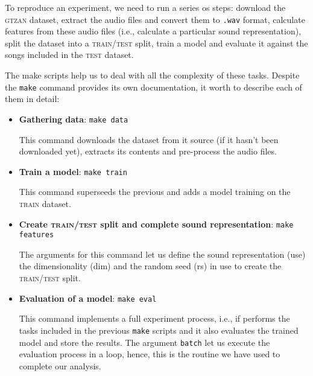 To reproduce an experiment, we need to run a series os steps: download the \textsc{gtzan} dataset, extract the audio files and convert them to \texttt{.wav} format, calculate features from these audio files (i.e., calculate a particular sound representation), split the dataset into a \textsc{train/test} split, train a model and evaluate it against the songs included in the \textsc{test} dataset.

The make scripts help us to deal with all the complexity of these tasks. Despite the \texttt{make} command provides its own documentation, it worth to describe each of them in detail:

\begin{itemize}

  \item {
    {\bf Gathering data}: \texttt{make data}


    This command downloads the dataset from it source (if it hasn't been downloaded yet), extracts its contents and pre-process the audio files.
  }

  \item{
    {\bf Train a model}: \texttt{make train}


    This command superseeds the previous and adds a model training on the \textsc{train} dataset.
  }

  \item{
    {\bf Create \textsc{train/test} split and complete sound representation}: \texttt{make features}


    The arguments for this command let us define the sound representation (use) the dimensionality (dim) and the random seed (rs) in use to create the \textsc{train/test} split.
  }

  \item{
    {\bf Evaluation of a model}: \texttt{make eval}


    This command implements a full experiment process, i.e., if performs the tasks included in the previous \texttt{make} scripts and it also evaluates the trained model and store the results. The argument \texttt{batch} let us execute the evaluation process in a loop, hence, this is the routine we have used to complete our analysis.
    \newpage
  }
\end{itemize}


